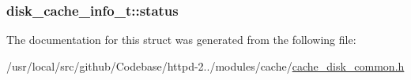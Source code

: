 \subsubsection[{\texorpdfstring{status}{status}}]{ disk\+\_\+cache\+\_\+info\+\_\+t\+::status}\hypertarget{structdisk__cache__info__t_a203cc80c248e563a732c40b3536be184}{}\label{structdisk__cache__info__t_a203cc80c248e563a732c40b3536be184}


The documentation for this struct was generated from the following file\+:\begin{DoxyCompactItemize}
\item 
/usr/local/src/github/\+Codebase/httpd-\/2../modules/cache/\hyperlink{cache__disk__common_8h}{cache\+\_\+disk\+\_\+common.\+h}\end{DoxyCompactItemize}
